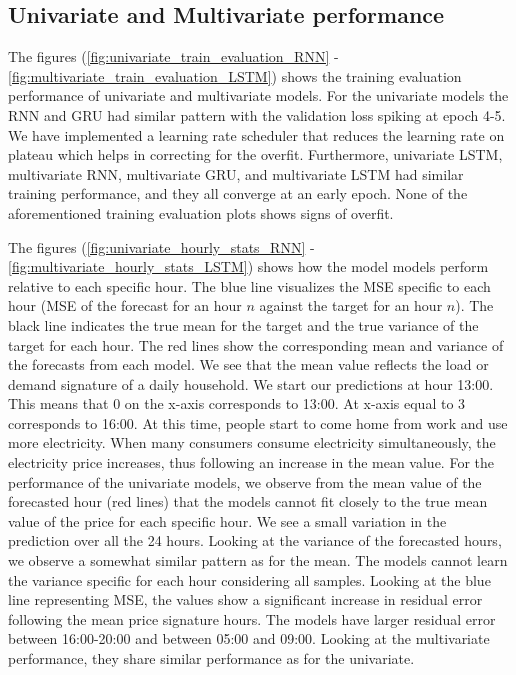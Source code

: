 \documentclass
[twocolumn,
secnumarabic,
nobibnotes,
aps,
prl,
reprint,
groupedaddress,
amsmath,
amssymb,
]{revtex4-2}
\begin{document}
\subsection{Univariate and Multivariate performance}
The figures (\ref{fig:univariate_train_evaluation_RNN} - \ref{fig:multivariate_train_evaluation_LSTM}) shows the training evaluation performance of univariate and multivariate models. For the univariate models the RNN and GRU had similar pattern with the validation loss spiking at epoch 4-5. We have implemented a learning rate scheduler that reduces the learning rate on plateau which helps in correcting for the overfit. Furthermore, univariate LSTM, multivariate RNN, multivariate GRU, and multivariate LSTM had similar training performance, and they all converge at an early epoch. None of the aforementioned training evaluation plots shows signs of overfit.


The figures (\ref{fig:univariate_hourly_stats_RNN} - \ref{fig:multivariate_hourly_stats_LSTM}) 
shows how the model models perform relative to each specific hour. The blue line visualizes the MSE specific to each hour (MSE of the forecast for an hour $n$ against the target for an hour $n$). The black line indicates the true mean for the target and the true variance of the target for each hour. The red lines show the corresponding mean and variance of the forecasts from each model. We see that the mean value reflects the load or demand signature of a daily household. We start our predictions at hour 13:00. This means that $0$ on the x-axis corresponds to 13:00. At x-axis equal to 3 corresponds to 16:00. At this time, people start to come home from work and use more electricity. When many consumers consume electricity simultaneously, the electricity price increases, thus following an increase in the mean value. For the performance of the univariate models, we observe from the mean value of the forecasted hour (red lines) that the models cannot fit closely to the true mean value of the price for each specific hour. We see a small variation in the prediction over all the 24 hours. Looking at the variance of the forecasted hours, we observe a somewhat similar pattern as for the mean. The models cannot learn the variance specific for each hour considering all samples. Looking at the blue line representing MSE, the values show a significant increase in residual error following the mean price signature hours. The models have larger residual error between 16:00-20:00 and between 05:00 and 09:00. Looking at the multivariate performance, they share similar performance as for the univariate. 
\end{document}
